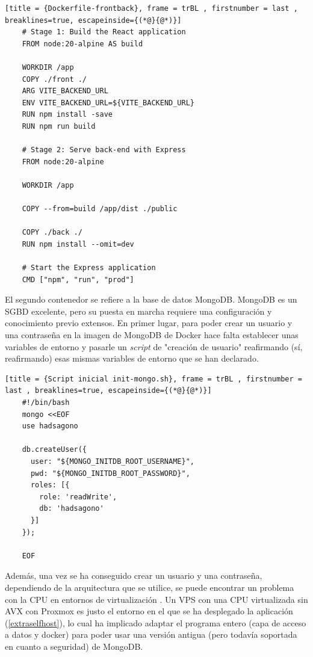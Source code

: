 \documentclass[12pt,epsf,titlepage,a4paper]{article}
\begin{document}
    \begin{lstlisting}[title = {Dockerfile-frontback}, frame = trBL , firstnumber = last , breaklines=true, escapeinside={(*@}{@*)}]
    # Stage 1: Build the React application
    FROM node:20-alpine AS build
    
    WORKDIR /app
    COPY ./front ./
    ARG VITE_BACKEND_URL
    ENV VITE_BACKEND_URL=${VITE_BACKEND_URL}
    RUN npm install -save
    RUN npm run build
    
    # Stage 2: Serve back-end with Express
    FROM node:20-alpine
    
    WORKDIR /app
    
    COPY --from=build /app/dist ./public
    
    COPY ./back ./
    RUN npm install --omit=dev
    
    # Start the Express application
    CMD ["npm", "run", "prod"]
    \end{lstlisting}


El segundo contenedor se refiere a la base de datos MongoDB\label{MongoDBDocker}. MongoDB es un SGBD excelente, pero su puesta en marcha requiere una configuración y conocimiento previo extensos. En primer lugar, para poder crear un usuario y una contraseña en la imagen de MongoDB de Docker \cite{dockermongo} hace falta establecer unas variables de entorno y pasarle un \emph{script} de "creación de usuario" reafirmando (sí, reafirmando) esas mismas variables de entorno que se han declarado.

    \begin{lstlisting}[title = {Script inicial init-mongo.sh}, frame = trBL , firstnumber = last , breaklines=true, escapeinside={(*@}{@*)}]
    #!/bin/bash
    mongo <<EOF
    use hadsagono
    
    db.createUser({
      user: "${MONGO_INITDB_ROOT_USERNAME}",
      pwd: "${MONGO_INITDB_ROOT_PASSWORD}",
      roles: [{
        role: 'readWrite',
        db: 'hadsagono'
      }]
    });
    
    EOF

    \end{lstlisting}
Además, una vez se ha conseguido crear un usuario y una contraseña, dependiendo de la arquitectura que se utilice, se puede encontrar un problema con la CPU en entornos de virtualización \cite{mongodbbug}. Un VPS con una CPU virtualizada sin AVX con Proxmox es justo el entorno en el que se ha desplegado la aplicación (\ref{extraselfhost}), lo cual ha implicado adaptar el programa entero (capa de acceso a datos y docker) para poder usar una versión antigua (pero todavía soportada en cuanto a seguridad) de MongoDB.
\end{document}
